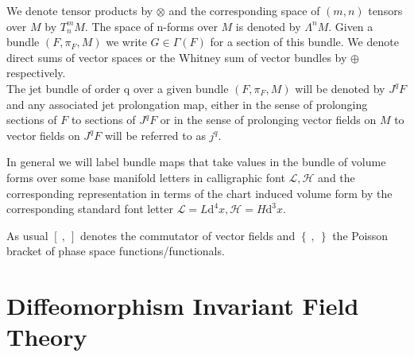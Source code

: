\documentclass[a4paper,12pt, DIV=14, BCOR=5mm, twoside, headsepline, numbers=noenddot]{scrbook}
\begin{document}
We denote tensor products by $\otimes$ and the corresponding space of $(m,n)$ tensors over $M$ by $T^m_nM$. The space of n-forms over $M$ is denoted by $\Lambda^nM$. Given a bundle $(F,\pi_{F},M)$ we write $G \in \Gamma(F) $ for a section of this bundle. We denote direct sums of vector spaces or the Whitney sum of vector bundles by $\oplus$ respectively. \\

The jet bundle of order q over a given bundle $(F,\pi_F,M)$ will be denoted by $J^qF$ and any associated jet prolongation map, either in the sense of prolonging sections of $F$ to sections of $J^qF$ or in the sense of prolonging vector fields on $M$ to vector fields on $J^qF$ will be referred to as $j^q$. 

In general we will label bundle maps that take values in the bundle of volume forms over some base manifold letters in calligraphic font $\mathcal{L}, \mathcal{H}$ and the corresponding representation in terms of the chart induced volume form by the corresponding standard font letter $\mathcal{L}=L \mathrm{d}^4x, \mathcal{H}= H \mathrm{d}^3x$.

As usual $\left[ \  ,   \  \right]$ denotes the commutator of vector fields and $\left \{  \  ,   \   \right \}$ the Poisson bracket of phase space functions/functionals. 

\chapter{Diffeomorphism Invariant Field Theory}\label{chapter1}

\end{document}
